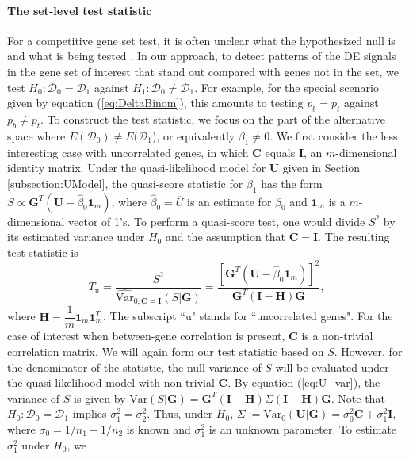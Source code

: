 	
	\paragraph{The set-level test statistic}\label{subsection:MEQL}
	For a competitive gene set test, it is often unclear what the hypothesized null is and what is
	being tested \citep{barry2008statistical,wu2012camera}. In our approach, to detect patterns of 
	the DE signals in the gene set of interest that stand out compared with genes not in the set, 
	we test $H_0: \mathscr{D}_0=\mathscr{D}_1$ against $H_1: \mathscr{D}_0\ne\mathscr{D}_1$. For 
	example, for the special scenario given by equation (\ref{eq:DeltaBinom}), this amounts to 
	testing $p_{b}=p_{t}$ against $p_{b}\ne p_{t}$.
	To construct the test statistic, we focus on the part of the alternative space where
	$E(\mathscr{D}_0)\ne E(\mathscr{D}_1$), or equivalently $\beta_1\ne 0$. We first consider the 
	less
	interesting case with uncorrelated genes, in which $\bm C$ equals $\bm I$, an $m$-dimensional
	identity matrix. Under the quasi-likelihood model for $\bm U$ given in Section
	\ref{subsection:UModel},  the quasi-score statistic for $\beta_1$ has the form $S \propto \bm
	G^T(\bm U-\hat\beta_0\bm 1_m)$, where $\hat\beta_0=\overline{U}$ is an estimate for $\beta_0$ 
	and
	$\bm 1_m$ is a $m$-dimensional vector of 1's. To perform a quasi-score test, one would divide 
	$S^2$
	by its estimated variance under $H_0$ and the assumption that $\bm C=\bm I$. The resulting test
	statistic is 
	\begin{equation}
	T_{\text{u}} = \dfrac{S^2}{\widehat{\mbox{Var}}_{0, \bm C=\bm I}(S|\bm G)} = \dfrac{[\bm G^T(\bm
		U-\hat\beta_0\bm 1_m)]^2}{\bm G^T(\bm I-\bm H)\bm G}, 
	\end{equation}
	where $\bm H = \dfrac{1}{m}\bm 1_m\bm 1_m^T$. The subscript ``u" stands for ``uncorrelated 
	genes".
	For the case of interest when between-gene correlation is present, $\bm C$ is a non-trivial
	correlation matrix. We will again form our test statistic based on $S$. However, for the
	denominator of the statistic, the null variance of $S$ will be evaluated under the 
	quasi-likelihood
	model with non-trivial $\bm C$. By equation (\ref{eq:U_var}), the variance of $S$ is given by
	$\mbox{Var}(S|\bm G) = \bm G^T(\bm I-\bm H)\Sigma(\bm I-\bm H)\bm G$. Note that $H_0:
	\mathscr{D}_0=\mathscr{D}_1$ implies $\sigma_1^2=\sigma_2^2$. Thus, under $H_0$,
	$\Sigma:=\mbox{Var}_{0}(\bm U|\bm G)=\sigma_0^2\bm C+\sigma_1^2\bm I$, where 
	$\sigma_0=1/n_1+1/n_2$
	is known and $\sigma_1^2$ is an unknown parameter. To estimate $\sigma_1^2$ under $H_0$, we 
